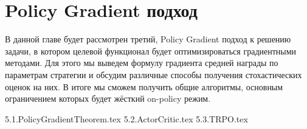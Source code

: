 \documentclass[../main.tex]{subfiles}
\begin{document}
\chapter{Policy Gradient подход}\label{policygradientchapter}

В данной главе будет рассмотрен третий, Policy Gradient подход к решению задачи, в котором целевой функционал будет оптимизироваться градиентными методами. Для этого мы выведем формулу градиента средней награды по параметрам стратегии и обсудим различные способы получения стохастических оценок на них. В итоге мы сможем получить общие алгоритмы, основным ограничением которых будет жёсткий on-policy режим.

{5.1.PolicyGradientTheorem.tex}
{5.2.ActorCritic.tex}
{5.3.TRPO.tex}
\end{document}
